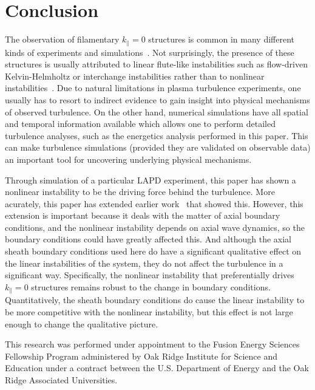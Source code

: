 \documentclass[showpacs,preprintnumbers,amsmath,amssymb,superscriptaddress,aip]{revtex4-1}
\def\para{\parallel}
\begin{document}
\section{Conclusion}
\label{conclusion}

The observation of filamentary $k_\para = 0$ structures is common in many different kinds of experiments and simulations~\cite{rogers2010}. 
Not surprisingly, the presence of these structures is usually attributed to linear flute-like instabilities such as flow-driven Kelvin-Helmholtz or interchange instabilities rather than to 
nonlinear instabilities~\cite{rogers2010}.
Due to natural limitations in plasma turbulence experiments, one usually has to resort to indirect evidence to 
gain insight into physical mechanisms of observed turbulence. 
On the other hand, numerical simulations have all spatial and temporal information available which allows one to perform detailed turbulence analyses, such as the energetics analysis
performed in this paper. 
This can make turbulence simulations (provided they are validated on observable data) an important tool for uncovering underlying physical mechanisms.

Through simulation of a particular LAPD experiment, this paper has shown a nonlinear instability to be the driving force behind the turbulence. More acurately, this paper has extended
earlier work~\cite{friedman2012b} that showed this. However, this extension is important because it deals with the matter of axial boundary conditions, and the nonlinear instability
depends on axial wave dynamics, so the boundary conditions could have greatly affected this. And although the axial sheath boundary conditions used here do
have a significant qualitative effect on the linear instabilities of the system, they do not affect the turbulence in a significant way.
Specifically, the nonlinear instability that preferentially drives $k_\para = 0$ structures remains robust to the change in boundary conditions. Quantitatively, the sheath boundary conditions
do cause the linear instability to be more competitive with the nonlinear instability, but this effect is not large enough to change the qualitative picture. 




\begin{acknowledgments}
This research was performed under appointment to the Fusion Energy Sciences Fellowship Program administered by Oak Ridge Institute for
Science and Education under a contract between the U.S. Department of Energy and the Oak Ridge Associated Universities. 
\end{acknowledgments}
\end{document}
